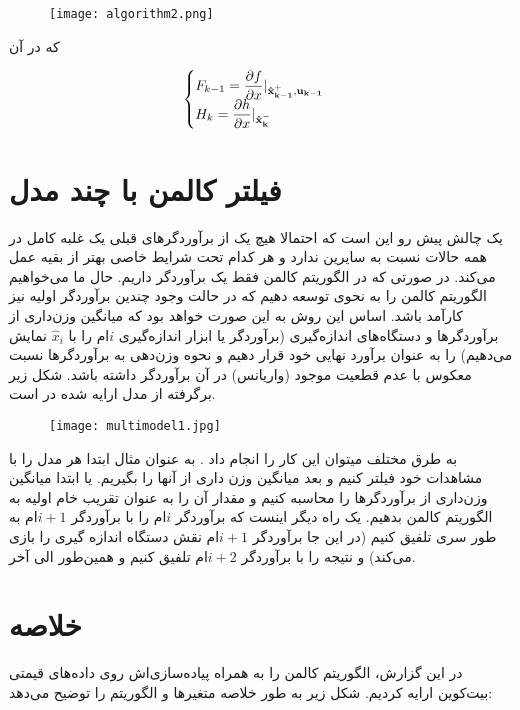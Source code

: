 \documentclass{scribe-cgenomics}
\begin{document}
\begin{figure}\label{extendedalgo}
\texttt{[image: algorithm2.png]}
\centering
\end{figure}

که در آن

\begin{equation}
\begin{cases}
F_{k-1} = \dfrac{\partial f}{\partial x} |_{\bold{\hat{x}^+_{k-1}}, \bold{u_{k-1}}}\\
H_{k} = \dfrac{\partial h}{\partial x}|_{\bold{\hat{x}^-_{k}}}
\end{cases}
\end{equation}


\section{فیلتر کالمن با چند مدل}
 یک چالش پیش رو این است که احتمالا هیچ یک از برآوردگرهای قبلی یک غلبه کامل در همه حالات نسبت به سایرین ندارد و هر کدام تحت شرایط خاصی بهتر از بقیه عمل می‌کند. در صورتی که در الگوریتم کالمن فقط یک برآوردگر داریم.
حال ما می‌خواهیم الگوریتم کالمن را به نحوی توسعه دهیم که در حالت وجود چندین برآوردگر اولیه نیز کارآمد باشد. اساس این روش به این صورت خواهد بود که میانگین وزن‌داری از برآوردگرها و دستگاه‌های اندازه‌گیری (برآوردگر یا ابزار اندازه‌گیری  
$i$ام 
را با
$\hat{x}_i$
 نمایش می‌دهیم) را به عنوان برآورد نهایی خود قرار دهیم و نحوه وزن‌دهی به برآوردگرها نسبت معکوس با عدم قطعیت موجود (واریانس) در آن برآوردگر داشته باشد. شکل زیر برگرفته از مدل ارایه شده در
 \cite{multimodels2}
 است.
 

\begin{figure}[H]\label{multimodel}
\texttt{[image: multimodel1.jpg]}
\centering
\end{figure}
 
 
به طرق مختلف میتوان این کار را انجام داد
\cite{multimodels}. به عنوان مثال ابتدا هر مدل را با مشاهدات خود فیلتر کنیم و بعد میانگین وزن داری از آنها را بگیریم. یا ابتدا میانگین وزن‌داری از برآوردگرها را محاسبه کنیم و مقدار آن را به عنوان تقریب خام اولیه به الگوریتم کالمن بدهیم. یک راه دیگر اینست که برآوردگر
$i$ام 
را با برآوردگر 
$i+1$ام
به طور سری تلفیق کنیم (در این جا برآوردگر 
$i+1$ام
 نقش دستگاه اندازه گیری را بازی می‌کند) و نتیجه را با برآوردگر
 $i+2$ام
  تلفیق کنیم و همین‌طور الی آخر.




\section{خلاصه}
در این گزارش، الگوریتم کالمن را به همراه پیاده‌سازی‌اش روی داده‌های قیمتی بیت‌کوین ارایه کردیم. شکل زیر به طور خلاصه متغیرها و الگوریتم را توضیح می‌دهد:
\end{document}
